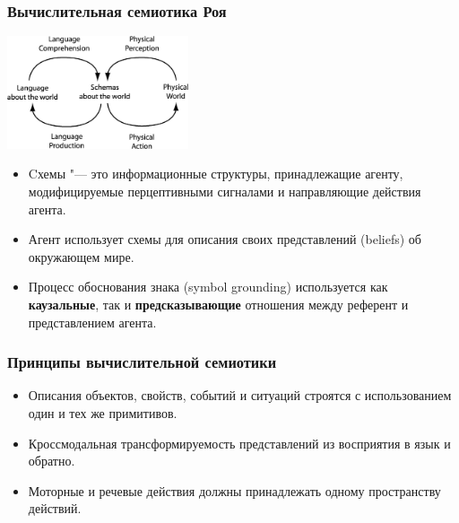 \documentclass[default]{beamer}
\begin{document}
	\begin{frame}
		\frametitle{Вычислительная семиотика Роя}
		
		\begin{center}
			\includegraphics[width=0.4\textwidth]{roy_grounding}
		\end{center}

		\begin{itemize}
			\item Cхемы "--- это информационные структуры, принадлежащие агенту, модифицируемые перцептивными сигналами и направляющие действия агента.
			\item Агент использует схемы для описания своих представлений (beliefs) об окружающем мире.
			\item Процесс обоснования знака (symbol grounding) используется как \textbf{каузальные}, так и \textbf{предсказывающие} отношения между референт и представлением агента.
		\end{itemize}
	\end{frame}

	\begin{frame}
		\frametitle{Принципы вычислительной семиотики}
		
		\begin{itemize}
			\item Описания объектов, свойств, событий и ситуаций строятся с использованием один и тех же примитивов.
			\item Кроссмодальная трансформируемость представлений из восприятия в язык и обратно.
			\item Моторные  и речевые действия должны принадлежать одному пространству действий.
		\end{itemize}
	\end{frame}
\end{document}
